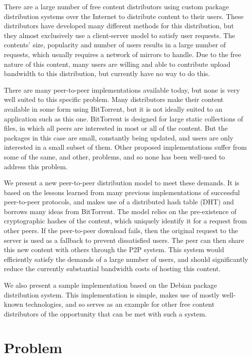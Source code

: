 \documentclass[conference]{IEEEtran}
\begin{document}
There are a large number of free content distributors using custom
package distribution systems over the Internet to distribute content
to their users. These distributors have developed many different
methods for this distribution, but they almost exclusively use a
client-server model to satisfy user requests. The contents' size,
popularity and number of users results in a large number of
requests, which usually requires a network of mirrors to handle. Due
to the free nature of this content, many users are willing and able
to contribute upload bandwidth to this distribution, but currently
have no way to do this.

There are many peer-to-peer implementations available today, but
none is very well suited to this specific problem. Many distributors
make their content available in some form using BitTorrent, but it
is not ideally suited to an application such as this one. BitTorrent
is designed for large static collections of files, in which all
peers are interested in most or all of the content. But the packages
in this case are small, constantly being updated, and users are only
interested in a small subset of them. Other proposed implementations
suffer from some of the same, and other, problems, and so none has
been well-used to address this problem.

We present a new peer-to-peer distribution model to meet these
demands. It is based on the lessons learned from many previous
implementations of successful peer-to-peer protocols, and makes use
of a distributed hash table (DHT) and borrows many ideas from
BitTorrent. The model relies on the pre-existence of cryptographic
hashes of the content, which uniquely identify it for a request from
other peers. If the peer-to-peer download fails, then the original
request to the server is used as a fallback to prevent dissatisfied
users. The peer can then share this new content with others through
the P2P system. This system would efficiently satisfy the demands of
a large number of users, and should significantly reduce the
currently substantial bandwidth costs of hosting this content.

We also present a sample implementation based on the Debian package
distribution system. This implementation is simple, makes use of
mostly well-known technologies, and so serves as an example for
other free content distributors of the opportunity that can be met
with such a system.

\section{Problem}
\end{document}
